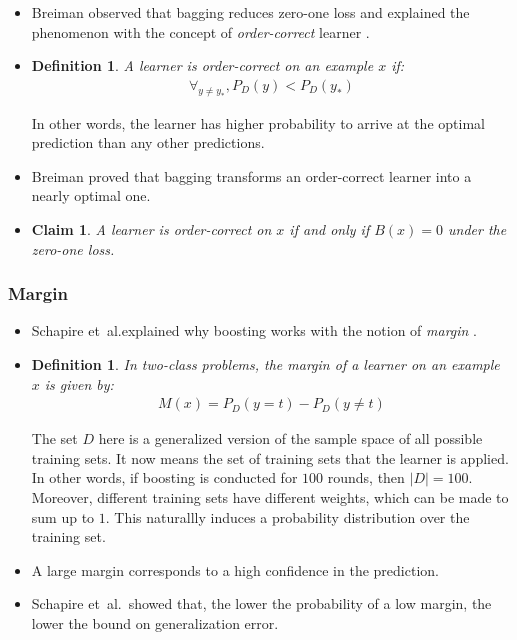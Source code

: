 \documentclass[10pt]{article}
\newtheorem{definition}[lemma]{Definition}
\newtheorem{claim}[lemma]{Claim}
\newcommand{\etal}{{et~al.}}
\begin{document}
  \begin{itemize}
    \item Breiman observed that bagging reduces zero-one loss and explained the phenomenon with the concept of \emph{order-correct} learner \cite{Breiman:1996}.

    \item \begin{definition}
      A learner is \emph{order-correct} on an example $x$ if:
      \begin{align*}
        \forall_{y \neq y_*}, P_D(y) < P_D(y_*)
      \end{align*}          
    \end{definition}
    In other words, the learner has higher probability to arrive at the optimal prediction than any other predictions.

    \item Breiman proved that bagging transforms an order-correct learner into a nearly optimal one.

    \item \begin{claim}
      A learner is order-correct on $x$ if and only if $B(x) = 0$ under the zero-one loss.
    \end{claim}
  \end{itemize}

  \subsubsection{Margin}

  \begin{itemize}
    \item Schapire \etal explained why boosting works with the notion of \emph{margin} \cite{Schapire:1997}.

    \item \begin{definition}
      In two-class problems, the margin of a learner on an example $x$ is given by:
      \begin{align*}
        M(x) = P_D(y=t) - P_D(y \neq t)
      \end{align*}    
    \end{definition}
    The set $D$ here is a generalized version of the sample space of all possible training sets. It now means the set of training sets that the learner is applied. In other words, if boosting is conducted for $100$ rounds, then $|D| = 100$. Moreover, different training sets have different weights, which can be made to sum up to $1$. This naturallly induces a probability distribution over the training set.

    \item A large margin corresponds to a high confidence in the prediction.

    \item Schapire \etal\ showed that, the lower the probability of a low margin, the lower the bound on generalization error.    
  \end{itemize}
\end{document}
